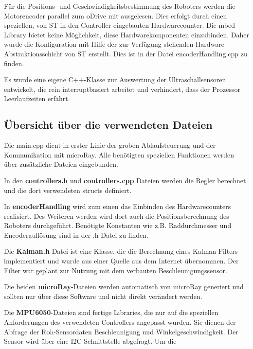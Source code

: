 \par\bigskip
Für die Positions- und Geschwindigkeitsbestimmung des Roboters werden die Motorencoder parallel zum oDrive mit ausgelesen. Dies erfolgt durch einen speziellen, von ST in den Controller eingebauten Hardwarecounter. Die mbed Library bietet keine Möglichkeit, diese Hardwarekomponenten einzubinden. Daher wurde die Konfiguration mit Hilfe der zur Verfügung stehenden Hardware-Abstraktionsschicht von ST erstellt. Dies ist in der Datei encoderHandling.cpp zu finden.


\par\bigskip
Es wurde eine eigene C++-Klasse zur Auswertung der Ultraschallsensoren entwickelt, die rein interruptbasiert arbeitet und verhindert, dass der Prozessor Leerlaufzeiten erfährt.

\subsection{Übersicht über die verwendeten Dateien}
Die main.cpp dient in erster Linie der groben Ablaufsteuerung und der Kommunikation mit microRay. Alle benötigten speziellen Funktionen werden über zusätzliche Dateien eingebunden.

\par\bigskip
In den \textbf{controllers.h} und \textbf{controllers.cpp} Dateien werden die Regler berechnet und die dort verwendeten structs definiert.

\par\bigskip
In \textbf{encoderHandling} wird zum einen das Einbinden des Hardwarecounters realisiert. Des Weiteren werden wird dort auch die Positionsberechnung des Roboters durchgeführt. Benötigte Konstanten wie z.B. Raddurchmesser und Encoderauflösung sind in der .h-Datei zu finden.

\par\bigskip
Die \textbf{Kalman.h}-Datei ist eine Klasse, die die Berechnung eines Kalman-Filters implementiert und wurde aus einer Quelle aus dem Internet übernommen. Der Filter war geplant zur Nutzung mit dem verbauten Beschleunigungssensor.

\par\bigskip
Die beiden \textbf{microRay}-Dateien werden automatisch von microRay generiert und sollten nur über diese Software und nicht direkt verändert werden.

\par\bigskip
Die \textbf{MPU6050}-Dateien sind fertige Libraries, die nur auf die speziellen Anforderungen des verwendeten Controllers angepasst wurden. Sie dienen der Abfrage der Roh-Sensordaten Beschleunigung und Winkelgeschwindigkeit. Der Sensor wird über eine I2C-Schnittstelle abgefragt. Um die

